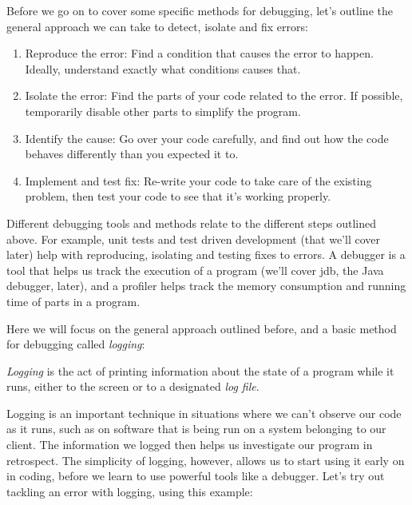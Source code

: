 Before we go on to cover some specific methods for debugging, let's outline the general approach we can take to detect, isolate and fix errors:

\begin{enumerate}
\item Reproduce the error: Find a condition that causes the error to happen. Ideally, understand exactly what conditions causes that.
\item Isolate the error: Find the parts of your code related to the error. If possible, temporarily disable other parts to simplify the program.
\item Identify the cause: Go over your code carefully, and find out how the code behaves differently than you expected it to.
\item Implement and test fix: Re-write your code to take care of the existing problem, then test your code to see that it's working properly.
\end{enumerate}

Different debugging tools and methods relate to the different steps outlined above. For example, unit tests and test driven development (that we'll cover later) help with reproducing, isolating and testing fixes to errors. A debugger is a tool that helps us track the execution of a program (we'll cover jdb, the Java debugger, later), and a profiler helps track the memory consumption and running time of parts in a program.

Here we will focus on the general approach outlined before, and a basic method for debugging called \emph{logging}:

\begin{definition}
\emph{Logging} is the act of printing information about the state of a program while it runs, either to the screen or to a designated \emph{log file}. 
\end{definition}

Logging is an important technique in situations where we can't observe our code as it runs, such as on software that is being run on a system belonging to our client. The information we logged then helps us investigate our program in retrospect. The simplicity of logging, however, allows us to start using it early on in coding, before we learn to use powerful tools like a debugger. Let's try out tackling an error with logging, using this example:

